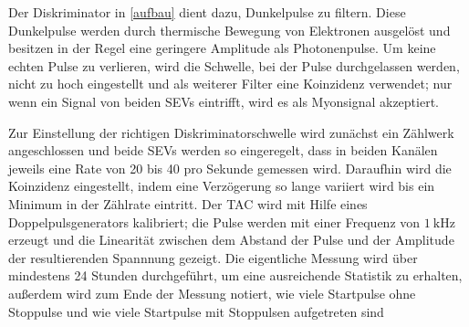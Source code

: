 Der Diskriminator in \autoref{aufbau} dient dazu, Dunkelpulse zu filtern. Diese Dunkelpulse werden durch thermische Bewegung von Elektronen ausgelöst und besitzen in der Regel eine geringere Amplitude als Photonenpulse. Um keine echten Pulse zu verlieren, wird die Schwelle, bei der Pulse durchgelassen werden, nicht zu hoch eingestellt und als weiterer Filter eine Koinzidenz verwendet; nur wenn ein Signal von beiden SEVs eintrifft, wird es als Myonsignal akzeptiert.

Zur Einstellung der richtigen Diskriminatorschwelle wird zunächst ein Zählwerk angeschlossen und beide SEVs werden so eingeregelt, dass in beiden Kanälen jeweils eine Rate von 20 bis 40 pro Sekunde gemessen wird. Daraufhin wird die Koinzidenz eingestellt, indem eine Verzögerung so lange variiert wird bis ein Minimum in der Zählrate eintritt. Der TAC wird mit Hilfe eines Doppelpulsgenerators kalibriert; die Pulse werden mit einer Frequenz von $\SI{1}{\kilo\hertz}$ erzeugt und die Linearität zwischen dem Abstand der Pulse und der Amplitude der resultierenden Spannnung gezeigt. Die eigentliche Messung wird über mindestens 24 Stunden durchgeführt, um eine ausreichende Statistik zu erhalten, außerdem wird zum Ende der Messung notiert, wie viele Startpulse ohne Stoppulse und wie viele Startpulse mit Stoppulsen aufgetreten sind

\FloatBarrier
